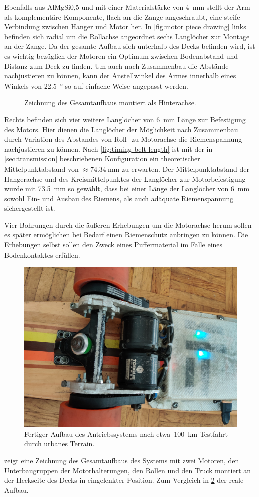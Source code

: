 		Ebenfalls aus AlMgSi0,5 und mit einer Materialstärke von \qty{4}{\milli\metre} stellt der Arm als komplementäre Komponente, flach an die Zange angeschraubt, eine steife Verbindung zwischen Hanger und Motor her.
		In \cref{fig:motor piece drawing} links befinden sich radial um die Rollachse angeordnet sechs Langlöcher zur Montage an der Zange.
		Da der gesamte Aufbau sich unterhalb des Decks befinden wird, ist es wichtig bezüglich der Motoren ein Optimum zwischen Bodenabstand und Distanz zum Deck zu finden.
		Um auch nach Zusammenbau die Abstände nachjustieren zu können, kann der Anstellwinkel des Armes innerhalb eines Winkels von \qty{22,5}{\degree} so auf einfache Weise angepasst werden.
		\begin{figure}[h]
			\centering
			
			\caption[Zeichnung des Gesamtaufbaus]{Zeichnung des Gesamtaufbaus montiert als Hinterachse.}
			\label{fig:drivetrain inclined}
		\end{figure}
		Rechts befinden sich vier weitere Langlöcher von \qty{6}{\milli\metre} Länge zur Befestigung des Motors.
		Hier dienen die Langlöcher der Möglichkeit nach Zusammenbau durch Variation des Abstandes von Roll- zu Motorachse die Riemenspannung nachjustieren zu können.
		Nach \cref{fig:timing belt length} ist mit der in \cref{sec:transmission} beschriebenen Konfiguration ein theoretischer Mittelpunktabstand von \(\approx \qty{74,34}{\milli\metre}\) zu erwarten.
		Der Mittelpunktabstand der Hangerachse und des Kreismittelpunktes der Langlöcher zur Motorbefestigung wurde mit \qty{73,5}{\milli\metre} so gewählt, dass bei einer Länge der Langlöcher von \qty{6}{\milli\metre} sowohl Ein- und Ausbau des Riemens, als auch adäquate Riemenspannung sichergestellt ist.

		Vier Bohrungen durch die äußeren Erhebungen um die Motorachse herum sollen es später ermöglichen bei Bedarf einen Riemenschutz anbringen zu können.
		Die Erhebungen selbst sollen den Zweck eines Puffermaterial im Falle eines Bodenkontaktes erfüllen.
		\begin{figure}[h]
			\centering
			\includegraphics[angle=180, width=.5\textwidth]{Footage/Pictures/Drivetrain close up v2.jpg}
			\caption[Fertiger Aufbau des Antriebssystems]{Fertiger Aufbau des Antriebssystems nach etwa~\qty{100}{\kilo\metre} Testfahrt durch urbanes Terrain.}
			\label{fig:real world assembly}
		\end{figure}

		 zeigt eine Zeichnung des Gesamtaufbaus des Systems mit zwei Motoren, den Unterbaugruppen der Motorhalterungen, den Rollen und den Truck montiert an der Heckseite des Decks in eingelenkter Position.
		Zum Vergleich in \cref{fig:real world assembly} der reale Aufbau.